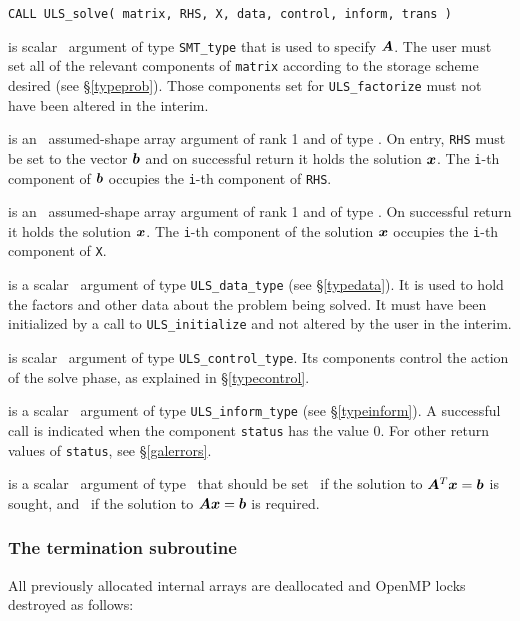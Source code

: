 \documentclass{galahad}
\newcommand{\packagename}{ULS}
\begin{document}
\hskip0.5in
{\tt CALL \packagename\_solve( matrix, RHS, X, data, control, inform, trans )}

\begin{description}

 is scalar \intentin\ argument of type {\tt SMT\_type}
that is used to specify ${\bm{A}}$.
The user must set all of the relevant components of {\tt matrix} according
to the storage scheme desired (see \S\ref{typeprob}). Those components
set for {\tt \packagename\_factorize} must not have been altered in the interim.

 is an \intentin\ assumed-shape array argument of rank 1
and of type \realdp.  On entry, {\tt RHS} must be set
to the vector ${\bm{b}}$ and on successful return it holds
the solution ${\bm{x}}$. The {\tt i}-th component of ${\bm{b}}$
occupies the {\tt i}-th component of {\tt RHS}. 

 is an \intentinout\ assumed-shape array argument of rank 1
and of type \realdp.  On successful return it holds the solution ${\bm{x}}$. 
The {\tt i}-th component of the solution ${\bm{x}}$
occupies the {\tt i}-th component of {\tt X}.

 is a scalar \intentinout\ argument of type
{\tt \packagename\_data\_type}
(see \S\ref{typedata}). It is used to hold the factors and other
data about the problem being solved.
It must have been initialized by a call to
{\tt \packagename\_ini\-tialize} and not altered by the user in the interim.

 is scalar \intentin\ argument of type
{\tt \packagename\_control\_type}. Its components control the action
of the solve phase, as explained in
\S\ref{typecontrol}.

 is a scalar \intentinout\ argument of type
{\tt \packagename\_inform\_type}
(see \S\ref{typeinform}).
A successful call is indicated when the  component {\tt status} has the value 0.
For other return values of {\tt status}, see \S\ref{galerrors}.

 is a scalar \intentin\ argument of type \logical\ that should be
set \true\ if the solution to ${\bm{A}}^T {\bm{x}} = {\bm{b}}$ is sought, 
and \false\ if the solution to ${\bm{A}} {\bm{x}} = {\bm{b}}$ is required.

\end{description}


\subsubsection{The termination subroutine}
All previously allocated internal arrays are deallocated and OpenMP locks
destroyed as follows:
\end{document}
